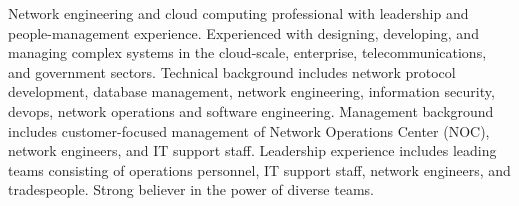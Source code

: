 \documentclass[letter,10pt]{article}
\begin{document}

\noindent
Network engineering and cloud computing professional with leadership and
people-management experience.  Experienced with designing, developing,
and managing complex systems in the cloud-scale, enterprise,
telecommunications, and government sectors.  Technical background
includes network protocol development, database management, network
engineering, information security, devops, network operations and
software engineering.  Management background includes customer-focused
management of Network Operations Center (NOC), network engineers, and IT support staff.  Leadership
experience includes leading teams consisting of operations personnel, IT
support staff, network engineers, and tradespeople.  Strong believer in
the power of diverse teams.
\end{document}
